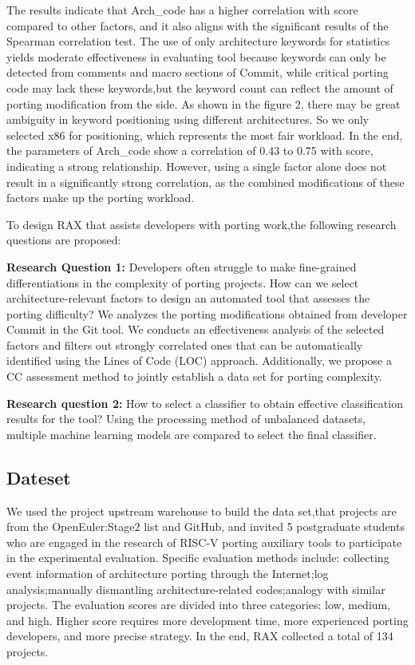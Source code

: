 \documentclass[sigconf,screen,review,anonymous]{acmart}
\begin{document}
The results indicate that Arch\_code has a higher correlation with score compared to other factors, and it also aligns with the significant results of the Spearman correlation test.
The use of only architecture keywords for statistics yields moderate effectiveness in evaluating tool because keywords can only be detected from comments and macro sections of Commit, while critical porting code may lack these keywords,but the keyword count can reflect the amount of porting modification from the side.
As shown in the figure 2, there may be great ambiguity in keyword positioning using different architectures.
So we only selected x86 for positioning, which represents the most fair workload.
In the end, the parameters of Arch\_code show a correlation of 0.43 to 0.75 with score, indicating a strong relationship.
However, using a single factor alone does not result in a significantly strong correlation, as the combined modifications of these factors make up the porting workload.

To design RAX that assists developers with porting work,the following research questions are proposed:

\textbf{Research Question 1:} Developers often struggle to make fine-grained differentiations in the complexity of porting projects.
How can we select architecture-relevant factors to design an automated tool that assesses the porting difficulty?
We analyzes the porting modifications obtained from developer Commit in the Git tool.
We conducts an effectiveness analysis of the selected factors and filters out strongly correlated ones that can be automatically identified using the Lines of Code (LOC) approach.
Additionally, we propose a CC assessment method to jointly establish a data set for porting complexity.

\textbf{Research question 2:} How to select a classifier to obtain effective classification results for the tool?
Using the processing method of unbalanced datasets, multiple machine learning models are compared to select the final classifier.

\subsection{Dateset}
We used the project upstream warehouse to build the data set,that projects are from the OpenEuler:Stage2 list and GitHub, and invited 5 postgraduate students who are engaged in the research of RISC-V porting auxiliary tools to participate in the experimental evaluation.
Specific evaluation methods include: collecting event information of architecture porting through the Internet;log analysis;manually dismantling architecture-related codes;analogy with similar projects.
The evaluation scores are divided into three categories: low, medium, and high.
Higher score requires more development time, more experienced porting developers, and more precise strategy.
In the end, RAX collected a total of 134 projects.
\end{document}
